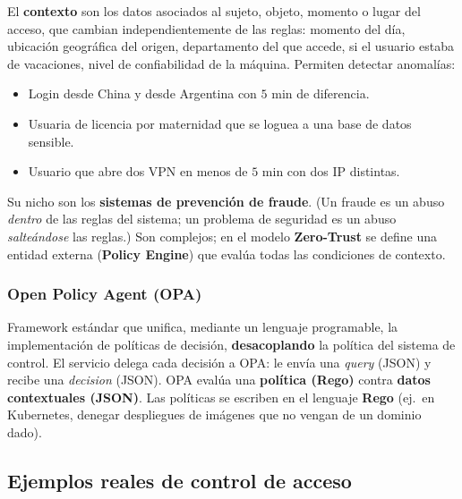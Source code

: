 \documentclass[../main.tex]{subfiles}
\begin{document}
El \textbf{contexto} son los datos asociados al sujeto, objeto, momento o lugar del acceso, que cambian independientemente de las reglas: momento del día, ubicación geográfica del origen, departamento del que accede, si el usuario estaba de vacaciones, nivel de confiabilidad de la máquina. Permiten detectar anomalías:
\begin{itemize}[nosep]
  \item Login desde China y desde Argentina con $5$ min de diferencia.
  \item Usuaria de licencia por maternidad que se loguea a una base de datos sensible.
  \item Usuario que abre dos VPN en menos de $5$ min con dos IP distintas.
\end{itemize}
Su nicho son los \textbf{sistemas de prevención de fraude}. (Un fraude es un abuso \emph{dentro} de las reglas del sistema; un problema de seguridad es un abuso \emph{salteándose} las reglas.) Son complejos; en el modelo \textbf{Zero-Trust} se define una entidad externa (\textbf{Policy Engine}) que evalúa todas las condiciones de contexto.

\subsubsection{Open Policy Agent (OPA)}

Framework estándar que unifica, mediante un lenguaje programable, la implementación de políticas de decisión, \textbf{desacoplando} la política del sistema de control. El servicio delega cada decisión a OPA: le envía una \emph{query} (JSON) y recibe una \emph{decision} (JSON). OPA evalúa una \textbf{política (Rego)} contra \textbf{datos contextuales (JSON)}. Las políticas se escriben en el lenguaje \textbf{Rego} (ej.\ en Kubernetes, denegar despliegues de imágenes que no vengan de un dominio dado).

\subsection{Ejemplos reales de control de acceso}
\end{document}
